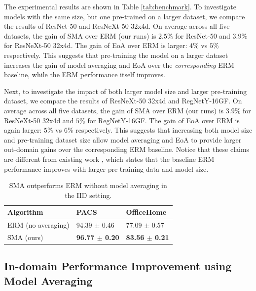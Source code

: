 \documentclass{article}
\begin{document}
The experimental results are shown in Table \ref{tab:benchmark}. To investigate models with the same size, but one pre-trained on a larger dataset, we compare the results of ResNet-50 and ResNeXt-50 32x4d. On average across all five datasets, the gain of SMA over ERM (our runs) is $2.5\%$ for ResNet-50 and $3.9\%$ for ResNeXt-50 32x4d. The gain of EoA over ERM is larger: $4\%$ vs $5\%$ respectively. This suggests that pre-training the model on a larger dataset increases the gain of model averaging and EoA over the \textit{corresponding} ERM baseline, while the ERM performance itself improves.

Next, to investigate the impact of both larger model size and larger pre-training dataset, we compare the results of ResNeXt-50 32x4d and RegNetY-16GF. On average across all five datasets, the gain of SMA over ERM (our runs) is $3.9\%$ for ResNeXt-50 32x4d and $5\%$ for RegNetY-16GF. The gain of EoA over ERM is again larger: $5\%$ vs $6\%$ respectively. This suggests that increasing both model size and pre-training dataset size allow model averaging and EoA to provide larger out-domain gains over the {corresponding} ERM baseline. Notice that these claims are different from existing work \cite{hendrycks2021many}, which states that the baseline ERM performance improves with larger pre-training data and model size.

\begin{table}
\small
\vspace{-20pt}
\centering
\caption{ SMA outperforms ERM without model averaging in the IID setting.}
\begin{tabular}{|l|l|l|}
\hline
Algorithm & PACS             & OfficeHome       \\ \hline
ERM (no averaging)      & 94.39 $\pm$ 0.46 & 77.09 $\pm$ 0.57 \\ \hline
SMA (ours) & \textbf{96.77 $\pm$ 0.20} & \textbf{83.56 $\pm$ 0.21} \\ \hline
\end{tabular}
\label{tab_iid}
\end{table}

\subsection{In-domain Performance Improvement using Model Averaging}
\end{document}
